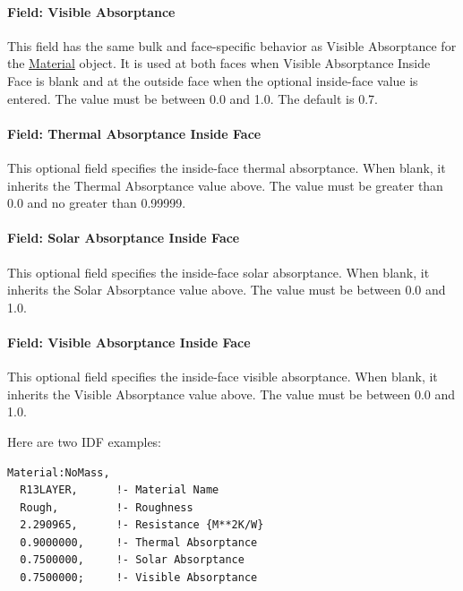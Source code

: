 \paragraph{Field: Visible Absorptance}\label{field-visible-absorptance-1}

This field has the same bulk and face-specific behavior as Visible Absorptance for the \hyperref[material]{Material} object. It is used at both faces when Visible Absorptance Inside Face is blank and at the outside face when the optional inside-face value is entered. The value must be between 0.0 and 1.0. The default is 0.7.

\paragraph{Field: Thermal Absorptance Inside Face}\label{field-thermal-absorptance-inside-face-1}

This optional field specifies the inside-face thermal absorptance. When blank, it inherits the Thermal Absorptance value above. The value must be greater than 0.0 and no greater than 0.99999.

\paragraph{Field: Solar Absorptance Inside Face}\label{field-solar-absorptance-inside-face-1}

This optional field specifies the inside-face solar absorptance. When blank, it inherits the Solar Absorptance value above. The value must be between 0.0 and 1.0.

\paragraph{Field: Visible Absorptance Inside Face}\label{field-visible-absorptance-inside-face-1}

This optional field specifies the inside-face visible absorptance. When blank, it inherits the Visible Absorptance value above. The value must be between 0.0 and 1.0.

Here are two IDF examples:

\begin{lstlisting}
Material:NoMass,
  R13LAYER,      !- Material Name
  Rough,         !- Roughness
  2.290965,      !- Resistance {M**2K/W}
  0.9000000,     !- Thermal Absorptance
  0.7500000,     !- Solar Absorptance
  0.7500000;     !- Visible Absorptance
\end{lstlisting}

